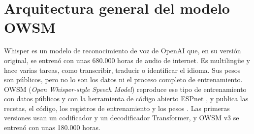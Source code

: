 %
%
%
%

\section{Arquitectura general del modelo OWSM}
\label{sec:owsm-teoria}
\label{sec:owsm-arquitectura}

Whisper \cite{radford2023whisper} es un modelo de reconocimiento de voz de OpenAI que, en su versión original, se entrenó con unas 680.000 horas de audio de internet. Es multilingüe y hace varias tareas, como transcribir, traducir o identificar el idioma. Sus pesos son públicos, pero no lo son los datos ni el proceso completo de entrenamiento. OWSM (\textit{Open Whisper-style Speech Model}) reproduce ese tipo de entrenamiento con datos públicos y con la herramienta de código abierto ESPnet \cite{watanabe2018espnet}, y publica las recetas, el código, los registros de entrenamiento y los pesos \cite{peng2023owsm}. Las primeras versiones usan un codificador y un decodificador Transformer, y OWSM v3 se entrenó con unas 180.000 horas.

